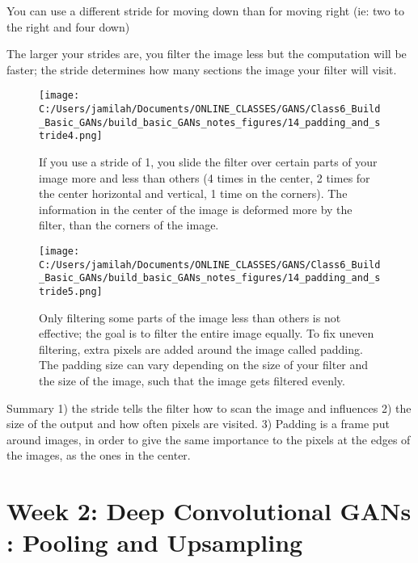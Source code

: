 \documentclass[11pt, onecolumn]{article}
\begin{document}
You can use a different stride for moving down than for moving right (ie:  two to the right and four down)

The larger your strides are, you filter the image less but the computation will be faster; the stride determines how many sections the image your filter will visit.

\begin{figure}[htp]
\begin{center}
\texttt{[image: C:/Users/jamilah/Documents/ONLINE\_CLASSES/GANS/Class6\_Build\_Basic\_GANs/build\_basic\_GANs\_notes\_figures/14\_padding\_and\_stride4.png]}
\end{center}
\caption{If you use a stride of 1, you slide the filter over certain parts of your image more and less than others (4 times in the center, 2 times for the center horizontal and vertical, 1 time on the corners). The information in the center of the image is deformed more by the filter, than the corners of the image.}
\label{14_padding_and_stride4}
\end{figure}

\begin{figure}[htp]
\begin{center}
\texttt{[image: C:/Users/jamilah/Documents/ONLINE\_CLASSES/GANS/Class6\_Build\_Basic\_GANs/build\_basic\_GANs\_notes\_figures/14\_padding\_and\_stride5.png]}
\end{center}
\caption{Only filtering some parts of the image less than others is not effective; the goal is to filter the entire image equally. To fix uneven filtering, extra pixels are added around the image called padding.  The padding size can vary depending on the size of your filter and the size of the image, such that the image gets filtered evenly.}
\label{14_padding_and_stride5}
\end{figure}

Summary
1) the stride tells the filter how to scan the image and influences
2) the size of the output and how often pixels are visited.
3) Padding is a frame put around images, in order to give the same importance to the pixels at the edges of the images, as the ones in the center. 


\section{Week 2: Deep Convolutional GANs : Pooling and Upsampling}
\end{document}
